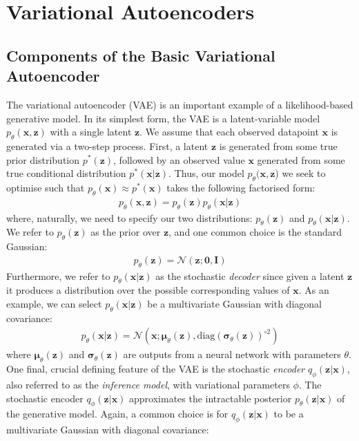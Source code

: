 \documentclass[ oneside,%
                    author={George Herbert},
                    degree={MSci},
                     title={Video Diffusion Models for Climate Simulations},
                  subtitle={}]{dissertation}
\begin{document}
\section{Variational Autoencoders}
\label{sec:background_vae}

\subsection{Components of the Basic Variational Autoencoder}
\label{sec:background_vae_latent}

The variational autoencoder (VAE) \cite{Autoencoding_Variational_Bayes_Kingma,Stochastic_Backpropagation_Rezende} is an important example of a likelihood-based generative model. In its simplest form, the VAE is a latent-variable model $p_\theta(\mathbf{x},\mathbf{z})$ with a single latent $\mathbf{z}$. We assume that each observed datapoint $\mathbf{x}$ is generated via a two-step process. First, a latent $\mathbf{z}$ is generated from some true prior distribution $p^*(\mathbf{z})$, followed by an observed value $\mathbf{x}$ generated from some true conditional distribution $p^*(\mathbf{x}|\mathbf{z})$. Thus, our model $p_\theta(\mathbf{x},\mathbf{z}$) we seek to optimise such that $p_\theta(\mathbf{x})\approx p^*(\mathbf{x})$ takes the following factorised form:
\begin{align}
      p_\theta(\mathbf{x},\mathbf{z})=p_\theta(\mathbf{z})p_\theta(\mathbf{x}|\mathbf{z})
\end{align}
where, naturally, we need to specify our two distributions: $p_\theta(\mathbf{z})$ and $p_\theta(\mathbf{x}|\mathbf{z})$. We refer to $p_\theta(\mathbf{z})$ as the prior over $\mathbf{z}$, and one common choice is the standard Gaussian:
\begin{align}
      p_\theta(\mathbf{z})=\mathcal{N}(\mathbf{z};\mathbf{0}, \mathbf{I})
\end{align}
Furthermore, we refer to $p_\theta(\mathbf{x}|\mathbf{z})$ as the stochastic \textit{decoder} since given a latent $\mathbf{z}$ it produces a distribution over the possible corresponding values of $\mathbf{x}$. As an example, we can select $p_\theta(\mathbf{x}|\mathbf{z})$ be a multivariate Gaussian with diagonal covariance:
\begin{align}
      p_\theta(\mathbf{x}|\mathbf{z})=\mathcal{N}(\mathbf{x}; \boldsymbol{\mu}_\theta (\mathbf{z}), \mathrm{diag}(\boldsymbol\sigma_\theta(\mathbf{z}))^{\circ 2})
\end{align}
where $\boldsymbol{\mu}_\theta(\mathbf{z})$ and $\boldsymbol\sigma_\theta(\mathbf{z})$ are outputs from a neural network with parameters $\theta$. One final, crucial defining feature of the VAE is the stochastic \textit{encoder} $q_\phi(\mathbf{z}|\mathbf{x})$, also referred to as the \textit{inference model}, with variational parameters $\phi$. The stochastic encoder $q_\phi(\mathbf{z}|\mathbf{x})$ approximates the intractable posterior $p_\theta(\mathbf{z}|\mathbf{x})$ of the generative model. Again, a common choice is for $q_\phi(\mathbf{z}|\mathbf{x})$ to be a multivariate Gaussian with diagonal covariance:
\end{document}
